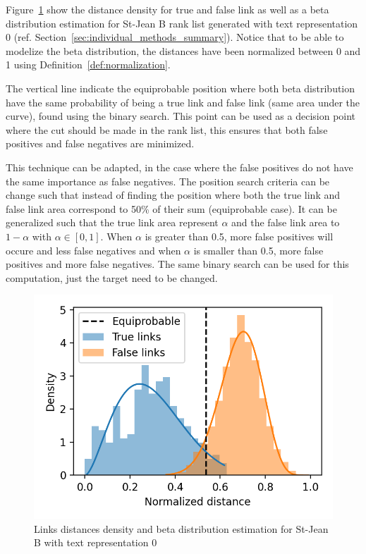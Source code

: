Figure~\ref{fig:links_score_density} show the distance density for true and false link as well as a beta distribution estimation for St-Jean B rank list generated with text representation 0 (ref. Section~\ref{sec:individual_methods_summary}).
Notice that to be able to modelize the beta distribution, the distances have been normalized between 0 and 1 using Definition~\ref{def:normalization}.

The vertical line indicate the equiprobable position where both beta distribution have the same probability of being a true link and false link (same area under the curve), found using the binary search.
This point can be used as a decision point where the cut should be made in the rank list, this ensures that both false positives and false negatives are minimized.

This technique can be adapted, in the case where the false positives do not have the same importance as false negatives.
The position search criteria can be change such that instead of finding the position where both the true link and false link area correspond to 50\% of their sum (equiprobable case).
It can be generalized such that the true link area represent $\alpha$ and the false link area to $1-\alpha$ with $\alpha \in \left[0,1\right]$.
When $\alpha$ is greater than 0.5, more false positives will occure and less false negatives and when $\alpha$ is smaller than 0.5, more false positives and more false negatives.
The same binary search can be used for this computation, just the target need to be changed.

\begin{figure}
  \caption{Links distances density and beta distribution estimation for St-Jean B with text representation 0}
  \label{fig:links_score_density}
  \includegraphics[width=\linewidth]{img/links_score_density.png}
\end{figure}

